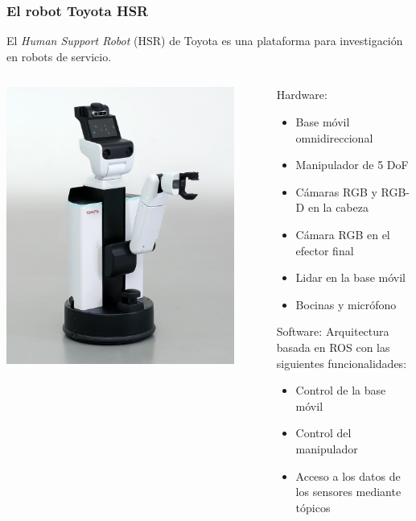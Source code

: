 \documentclass[10pt,spanish,aspectratio=1610]{beamer}
\begin{document}
\begin{frame}\frametitle{El robot Toyota HSR}
  El \textit{Human Support Robot} (HSR) de Toyota es una plataforma para investigación en robots de servicio.
  \begin{columns}
    \begin{column}{0.4\textwidth}
      \includegraphics[width=0.9\textwidth]{Figures/HSR.jpg}
    \end{column}
    \begin{column}{0.6\textwidth}
      Hardware:
      \begin{itemize}
      \item Base móvil omnidireccional
      \item Manipulador de 5 DoF
      \item Cámaras RGB y RGB-D en la cabeza
      \item Cámara RGB en el efector final
      \item Lidar en la base móvil
      \item Bocinas y micrófono
      \end{itemize}
      Software: Arquitectura basada en ROS con las siguientes funcionalidades:
      \begin{itemize}
      \item Control de la base móvil
      \item Control del manipulador
      \item Acceso a los datos de los sensores mediante tópicos
      \end{itemize}
    \end{column}
  \end{columns}
\end{frame}
\end{document}
